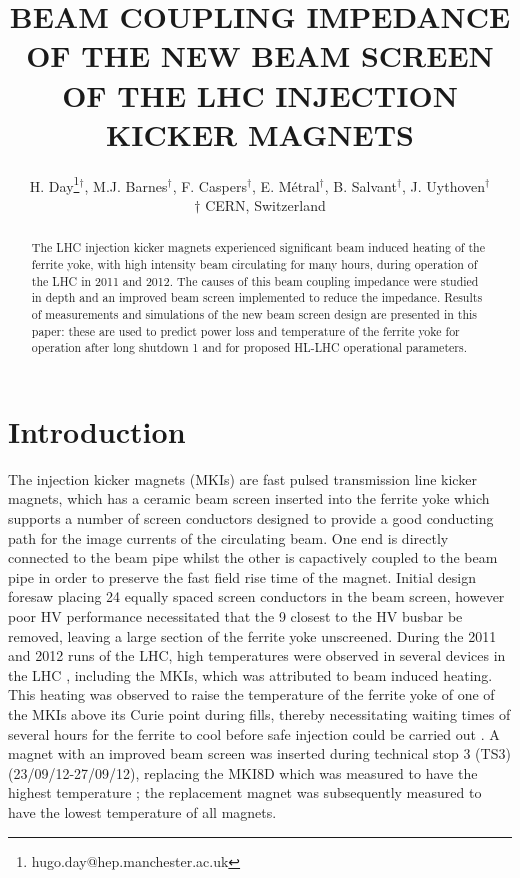 \documentclass[a4paper,
              ]{jacow}
\begin{document}
\title{BEAM COUPLING IMPEDANCE OF THE NEW BEAM SCREEN OF THE LHC INJECTION KICKER MAGNETS}
\author{H. Day\thanks{hugo.day@hep.manchester.ac.uk}$^{\dagger}$, M.J. Barnes$^{\dagger}$, F. Caspers$^{\dagger}$, E. Métral$^{\dagger}$, B. Salvant$^{\dagger}$, J. Uythoven$^{\dagger}$ \\
$\dagger$ CERN, Switzerland
}

\maketitle 


\begin{abstract}
The LHC injection kicker magnets experienced significant beam induced heating of the ferrite yoke, with high intensity beam circulating for many hours, during operation of the LHC in 2011 and 2012. The causes of this beam coupling impedance were studied in depth and an improved beam screen implemented to reduce the impedance. Results of measurements and simulations of the new beam screen design are presented in this paper: these are used to predict power loss and temperature of the ferrite yoke for operation after long shutdown 1 and for proposed HL-LHC operational parameters.
\end{abstract}

\section{Introduction}

The injection kicker magnets (MKIs) are fast pulsed transmission line kicker magnets, which has a ceramic beam screen inserted into the ferrite yoke which supports a number of screen conductors designed to provide a good conducting path for the image currents of the circulating beam. One end is directly connected to the beam pipe whilst the other is capactively coupled to the beam pipe in order to preserve the fast field rise time of the magnet. Initial design foresaw placing 24 equally spaced screen conductors in the beam screen, however poor HV performance necessitated that the 9 closest to the HV busbar be removed, leaving a large section of the ferrite yoke unscreened. During the 2011 and 2012 runs of the LHC, high temperatures were observed in several devices in the LHC \cite{mki-heating}, including the MKIs, which was attributed to beam induced heating. This heating was observed to raise the temperature of the ferrite yoke of one of the MKIs above its Curie point during fills, thereby necessitating waiting times of several hours for the ferrite to cool before safe injection could be carried out \cite{mki-heating}. A magnet with an improved beam screen was inserted during technical stop 3 (TS3) (23/09/12-27/09/12), replacing the MKI8D which was measured to have the highest temperature \cite{mki-heatingTemp}; the replacement magnet was subsequently measured to have the lowest temperature of all magnets.
\end{document}
